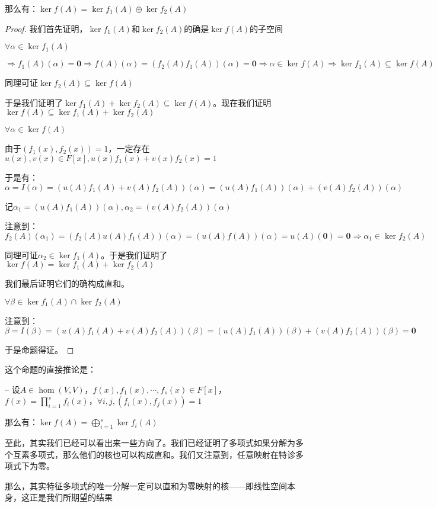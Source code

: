\documentclass[12pt, a4paper, oneside, UTF8]{ctexbook}
\begin{document}
\begin{para}{0}
\begin{proposition}
						那么有：$\ker f(A) = \ker f_1(A) \oplus \ker f_2(A)$
					\end{proposition}
					\begin{proof}
						我们首先证明，$\ker f_1(A)$和$\ker f_2(A)$的确是$\ker f(A)$的子空间

						$\forall \alpha \in \ker f_1(A)$

						$\Rightarrow f_1(A)(\alpha )=\mathbf{0} \Rightarrow f(A)(\alpha )=\left(f_2(A)f_1(A)\right)(\alpha )=\mathbf{0}\Rightarrow \alpha \in \ker f(A) \Rightarrow \ker f_1(A) \subseteq \ker f(A)$

						同理可证$\ker f_2(A) \subseteq \ker f(A)$

						于是我们证明了$\ker f_1(A)+\ker f_2(A) \subseteq \ker f(A)$。现在我们证明$\ker f(A) \subseteq \ker f_1(A)+\ker f_2(A)$

						$\forall \alpha \in \ker f(A)$

						由于$(f_1(x),f_2(x))=1$，一定存在$u(x),v(x) \in F[x],u(x)f_1(x)+v(x)f_2(x)=1$

						于是有：$\alpha = I(\alpha )=\left(u(A)f_1(A)+v(A)f_2(A)\right)(\alpha )=\left(u(A)f_1(A)\right)(\alpha )+\left(v(A)f_2(A)\right)(\alpha )$

						记$\alpha_1=\left(u(A)f_1(A)\right)(\alpha ),\alpha_2=\left(v(A)f_2(A)\right)(\alpha )$

						注意到：$f_2(A)(\alpha_1)=\left(f_2(A)u(A)f_1(A)\right)(\alpha )=\left(u(A)f(A)\right)(\alpha )=u(A)(\mathbf{0})=\mathbf{0} \Rightarrow \alpha_1 \in \ker f_2(A)$

						同理可证$\alpha_2 \in \ker f_1(A)$。于是我们证明了$\ker f(A)=\ker f_1(A)+\ker f_2(A)$

						我们最后证明它们的确构成直和。

						$\forall \beta \in \ker f_1(A) \cap \ker f_2(A)$

						注意到：$\beta = I(\beta )=\left(u(A)f_1(A)+v(A)f_2(A)\right)(\beta )=\left(u(A)f_1(A)\right)(\beta )+\left(v(A)f_2(A)\right)(\beta )=\mathbf{0}$

						于是命题得证。
					\end{proof}
					这个命题的直接推论是：
					\begin{corollary}{--}{}
						设$A \in \hom(V,V)$，$ f(x),f_1(x),\cdots,f_s(x)\in F[x]$，$f(x)=\prod\limits_{i=1}^{s} f_i(x)$，$\forall i,j,(f_i(x),f_j(x))=1$

						那么有：$\ker f(A) = \bigoplus_{i=1}^{s} \ker f_i(A)$
					\end{corollary}
					至此，其实我们已经可以看出来一些方向了。我们已经证明了多项式如果分解为多个互素多项式，那么他们的核也可以构成直和。我们又注意到，任意映射在特诊多项式下为零。

					那么，其实特征多项式的唯一分解一定可以直和为零映射的核——即线性空间本身，这正是我们所期望的结果
			\end{para}
\end{document}
